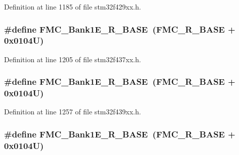 Definition at line 1185 of file stm32f429xx.\+h.

\subsubsection[{\texorpdfstring{F\+M\+C\+\_\+\+Bank1\+E\+\_\+\+R\+\_\+\+B\+A\+SE}{FMC_Bank1E_R_BASE}}]{\setlength{\rightskip}{0pt plus 5cm}\#define F\+M\+C\+\_\+\+Bank1\+E\+\_\+\+R\+\_\+\+B\+A\+SE~({\bf F\+M\+C\+\_\+\+R\+\_\+\+B\+A\+SE} + 0x0104\+U)}\hypertarget{group___peripheral__memory__map_gad82d3a6bac014fa645fb67a63fae4bc0}{}\label{group___peripheral__memory__map_gad82d3a6bac014fa645fb67a63fae4bc0}


Definition at line 1205 of file stm32f437xx.\+h.

\subsubsection[{\texorpdfstring{F\+M\+C\+\_\+\+Bank1\+E\+\_\+\+R\+\_\+\+B\+A\+SE}{FMC_Bank1E_R_BASE}}]{\setlength{\rightskip}{0pt plus 5cm}\#define F\+M\+C\+\_\+\+Bank1\+E\+\_\+\+R\+\_\+\+B\+A\+SE~({\bf F\+M\+C\+\_\+\+R\+\_\+\+B\+A\+SE} + 0x0104\+U)}\hypertarget{group___peripheral__memory__map_gad82d3a6bac014fa645fb67a63fae4bc0}{}\label{group___peripheral__memory__map_gad82d3a6bac014fa645fb67a63fae4bc0}


Definition at line 1257 of file stm32f439xx.\+h.

\subsubsection[{\texorpdfstring{F\+M\+C\+\_\+\+Bank1\+E\+\_\+\+R\+\_\+\+B\+A\+SE}{FMC_Bank1E_R_BASE}}]{\setlength{\rightskip}{0pt plus 5cm}\#define F\+M\+C\+\_\+\+Bank1\+E\+\_\+\+R\+\_\+\+B\+A\+SE~({\bf F\+M\+C\+\_\+\+R\+\_\+\+B\+A\+SE} + 0x0104\+U)}\hypertarget{group___peripheral__memory__map_gad82d3a6bac014fa645fb67a63fae4bc0}{}\label{group___peripheral__memory__map_gad82d3a6bac014fa645fb67a63fae4bc0}


